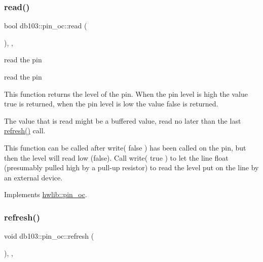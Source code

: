 \mbox{\label{classdb103_1_1pin__oc_ae48de2077c383bcab947278ee6564398}} 
\subsubsection{\texorpdfstring{read()}{read()}}
{\footnotesize\ttfamily bool db103\+::pin\+\_\+oc\+::read (\begin{DoxyParamCaption}{ }\end{DoxyParamCaption})\hspace{0.3cm}{\ttfamily [inline]}, {\ttfamily [override]}, {\ttfamily [virtual]}}





read the pin

read the pin

This function returns the level of the pin. When the pin level is high the value true is returned, when the pin level is low the value false is returned.

The value that is read might be a buffered value, read no later than the last \hyperlink{classdb103_1_1pin__oc_af033054181da84fd2392f611ca391ee3}{refresh()} call.

This function can be called after write( false ) has been called on the pin, but then the level will read low (false). Call write( true ) to let the line float (presumably pulled high by a pull-\/up resistor) to read the level put on the line by an external device. 

Implements \hyperlink{classhwlib_1_1pin__oc_a51180afd605add59b96105fa98e29f88}{hwlib\+::pin\+\_\+oc}.

\mbox{\label{classdb103_1_1pin__oc_af033054181da84fd2392f611ca391ee3}} 
\subsubsection{\texorpdfstring{refresh()}{refresh()}}
{\footnotesize\ttfamily void db103\+::pin\+\_\+oc\+::refresh (\begin{DoxyParamCaption}{ }\end{DoxyParamCaption})\hspace{0.3cm}{\ttfamily [inline]}, {\ttfamily [override]}, {\ttfamily [virtual]}}





